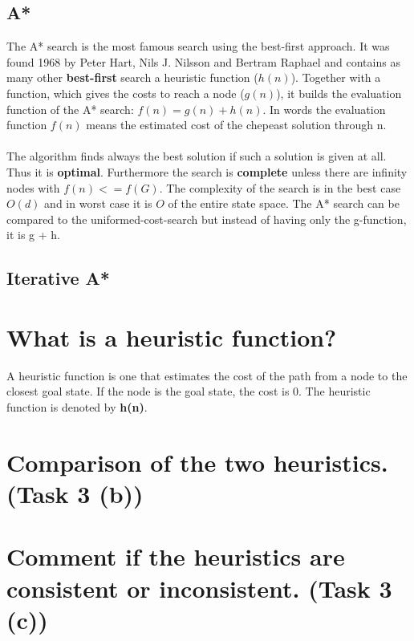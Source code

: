 \documentclass[11pt]{article}
\begin{document}
\subsection{A*}
The A* search is the most famous search using the best-first approach. It was found 1968 by Peter Hart, Nils J. Nilsson and Bertram Raphael and contains as many other \textbf{best-first} search a heuristic function ($h(n)$). Together with a function, which gives the costs to reach a node ($g(n)$), it builds the evaluation function of the A* search: $f(n) = g(n) + h(n)$. In words the evaluation function $f(n)$ means the estimated cost of the chepeast solution through n.\\
\\
The algorithm finds always the best solution if such a  solution is given at all. Thus it is \textbf{optimal}. Furthermore the search is \textbf{complete} unless there are infinity nodes with $f(n) <= f(G)$. The complexity of the search is in the best case $O(d)$ and in worst case it is $O$ of the entire state space. The A* search can be compared to the uniformed-cost-search but instead of having only the g-function, it is g + h.

\subsection{Iterative A*}

\newpage
\section{What is a heuristic function?}
A heuristic function is one that estimates the cost of the path from a node to the closest goal state. If the node is the goal state, the cost is 0. The heuristic function is denoted by \textbf{h(n)}.

\newpage
\section{Comparison of the two heuristics. (Task 3 (b))}

\newpage
\section{Comment if the heuristics are consistent or inconsistent. (Task 3 (c))}
\end{document}
